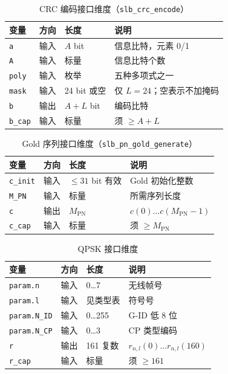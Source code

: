 \documentclass[11pt,a4paper]{ctexart}
\begin{document}
\begin{longtable}{L{3.2cm}L{2.8cm}L{2.2cm}L{6cm}}
\caption{CRC 编码接口维度（\texttt{slb\_crc\_encode}）\label{tab:6513-dim-crc}} \\
\toprule
\textbf{变量} & \textbf{方向} & \textbf{长度} & \textbf{说明} \\
\midrule
\texttt{a} & 输入 & $A$ bit & 信息比特，元素 0/1 \\
\texttt{A} & 输入 & 标量 & 信息比特个数 \\
\texttt{poly} & 输入 & 枚举 & 五种多项式之一 \\
\texttt{mask} & 输入 & 24 bit 或空 & 仅 $L{=}24$；空表示不加掩码 \\
\texttt{b} & 输出 & $A{+}L$ bit & 编码比特 \\
\texttt{b\_cap} & 输入 & 标量 & 须 $\geq A{+}L$ \\
\bottomrule
\end{longtable}

\begin{longtable}{L{3.2cm}L{2.8cm}L{2.2cm}L{6cm}}
\caption{Gold 序列接口维度（\texttt{slb\_pn\_gold\_generate}）\label{tab:6513-dim-gold}} \\
\toprule
\textbf{变量} & \textbf{方向} & \textbf{长度} & \textbf{说明} \\
\midrule
\texttt{c\_init} & 输入 & $\le 31$ bit 有效 & Gold 初始化整数 \\
\texttt{M\_PN} & 输入 & 标量 & 所需序列长度 \\
\texttt{c} & 输出 & $M_{\mathrm{PN}}$ & $c(0)\ldots c(M_{\mathrm{PN}}{-}1)$ \\
\texttt{c\_cap} & 输入 & 标量 & 须 $\geq M_{\mathrm{PN}}$ \\
\bottomrule
\end{longtable}

\begin{longtable}{L{3.2cm}L{2.8cm}L{2.2cm}L{6cm}}
\caption{QPSK 接口维度\label{tab:6513-dim-qpsk}} \\
\toprule
\textbf{变量} & \textbf{方向} & \textbf{长度} & \textbf{说明} \\
\midrule
\texttt{param.n} & 输入 & 0\ldots 7 & 无线帧号 \\
\texttt{param.l} & 输入 & 见类型表 & 符号号 \\
\texttt{param.N\_ID} & 输入 & 0\ldots 255 & G-ID 低 8 位 \\
\texttt{param.N\_CP} & 输入 & 0\ldots 3 & CP 类型编码 \\
\texttt{r} & 输出 & 161 复数 & $r_{n,l}(0)\ldots r_{n,l}(160)$ \\
\texttt{r\_cap} & 输入 & 标量 & 须 $\geq 161$ \\
\bottomrule
\end{longtable}
\end{document}
